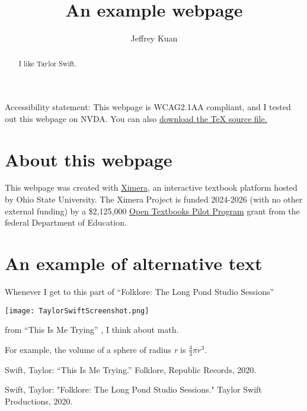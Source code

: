 \documentclass{ximera}
\author{Jeffrey Kuan}
\title{An example webpage}
\begin{document}
\begin{abstract}
   I like Taylor Swift.
\end{abstract}
\maketitle


Accessibility statement: This webpage is WCAG2.1AA compliant, and I tested out this webpage on NVDA. 
You can also \href{https://ximera.osu.edu/firststeps24html/aFirstStepInXimera/basics/MAA_AMS_Example.tex}{download the TeX source file.}

\section{About this webpage}
This webpage was created with \href{https://ximera.osu.edu/}{Ximera}, an 
interactive textbook platform hosted by Ohio State University. The Ximera Project is funded 2024-2026 (with no other external funding) by a 
\$2,125,000 \href{https://www.ed.gov/grants-and-programs/grants-higher-education/improvement-postsecondary-education/open-textbooks-pilot-program}{Open Textbooks Pilot Program} grant from the federal Department of Education.



\section{An example of alternative text}
Whenever I get to this part of ``Folklore: The Long Pond Studio Sessions'' \cite{F:LPSS} 

\texttt{[image: TaylorSwiftScreenshot.png]}

from ``This Is Me Trying'' \cite{TS8}, I think about math. 

For example, the volume of a sphere of radius \textit{r} is \(\frac{4}{3}\pi r^3.\)

\begin{thebibliography}{10}

 Swift, Taylor: “This Is Me Trying.” Folklore, Republic Records, 2020.

 Swift, Taylor: "Folklore: The Long Pond Studio Sessions." Taylor Swift Productions, 2020. 

\end{thebibliography}
\end{document}
